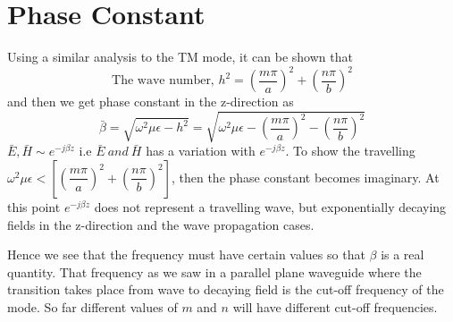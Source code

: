 \section{Phase Constant}
Using a similar analysis to the TM mode, it can be shown that 
$$
\text{The wave number, }h^2 =\left(\dfrac{m\pi}{a}\right)^2 + \left(\dfrac{n\pi}{b}\right)^2
$$
and then we get phase constant in the z-direction as 
\begin{dmath*}
\bar{\beta} = \sqrt{\omega^2\mu\epsilon - h^2}
= \sqrt{\omega^2\mu\epsilon-\left(\dfrac{m\pi}{a}\right)^2- \left(\dfrac{n\pi}{b}\right)^2}
\end{dmath*}
$\bar{E},\bar{H}\sim e^{-j\beta z}$ i.e $\bar{E}\ and\ \bar{H}$ has a variation with $e^{-j\beta z}$. To show the travelling $\omega^2\mu\epsilon < \left[\left(\dfrac{m\pi}{a}\right)^2 + \left(\dfrac{n\pi}{b}\right)^2\right]$, then the phase constant becomes imaginary. At this point $e^{-j\beta z}$ does not represent a travelling wave, but exponentially decaying fields in the z-direction and the wave propagation cases.

Hence we see that the frequency must have certain values so that $\beta$ is a real quantity. That frequency as we saw in a parallel plane waveguide where the transition takes place from wave to decaying field is the cut-off frequency of the mode. So far different values of $m$ and $n$ will have different cut-off frequencies. 

